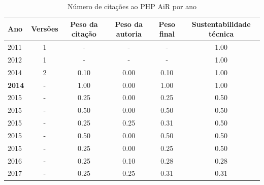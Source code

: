 \begin{table}[H]
\caption{Número de citações ao PHP AiR por ano}
\centering
\begin{tabular}{| l | c | c | c | c | c |}
  \hline
  Ano & Versões & Peso da citação & Peso da autoria & Peso final & Sustentabilidade técnica \\
  \hline
        2011 & 1 & - & - & -
        &
          {\color{blue} 1.00}
        \\
\hline
        2012 & 1 & - & - & -
        &
          {\color{blue} 1.00}
        \\
\hline
            2014
          &
          2
          &
          0.10
          &
          0.00
          &
          0.10
          &
            {\color{blue} 1.00}
          \\
            {\bf 2014}
          &
          -
          &
          1.00
          &
          0.00
          &
          1.00
          &
            {\color{blue} 1.00}
          \\
\hline
            2015
          &
          -
          &
          0.25
          &
          0.00
          &
          0.25
          &
            {\color{blue} 0.50}
          \\
            2015
          &
          -
          &
          0.50
          &
          0.00
          &
          0.50
          &
            {\color{blue} 0.50}
          \\
            2015
          &
          -
          &
          0.25
          &
          0.25
          &
          0.31
          &
            {\color{blue} 0.50}
          \\
            2015
          &
          -
          &
          0.50
          &
          0.00
          &
          0.50
          &
            {\color{blue} 0.50}
          \\
            2015
          &
          -
          &
          0.25
          &
          0.00
          &
          0.25
          &
            {\color{blue} 0.50}
          \\
\hline
            2016
          &
          -
          &
          0.25
          &
          0.10
          &
          0.28
          &
            {\color{red} 0.28}
          \\
\hline
            2017
          &
          -
          &
          0.25
          &
          0.25
          &
          0.31
          &
            {\color{red} 0.31}
          \\
\hline
\end{tabular}
\end{table}



